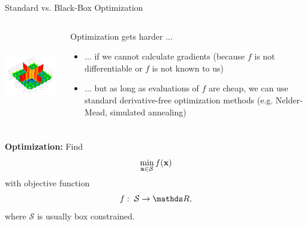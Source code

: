 \documentclass[11pt,compress,t,notes=noshow, xcolor=table]{beamer}
\begin{document}
\begin{vbframe}{Standard vs. Black-Box Optimization}
\begin{columns}
\begin{column}{0.4\textwidth}
\begin{center}
\includegraphics[height = 4cm]{figure_man/cross-in-tray.jpg}
\end{center}
\end{column}
\begin{column}{0.59\textwidth}
Optimization gets harder ...
\begin{itemize}
\item ... if we cannot calculate gradients (because $f$ is not differentiable or $f$ is not known to us)
\item ... but as long as evaluations of $f$ are cheap, we can use standard derivative-free optimization methods (e.g. Nelder-Mead, simulated annealing)
\end{itemize}
\end{column}
\end{columns}

\framebreak 

\textbf{Optimization: } Find
$$
\min_{\mathbf{x} \in \mathcal{S}} f(\mathbf{x})
$$
with objective function
$$
f: \; \mathcal{S} \to \R,
$$
where $\mathcal{S}$ is usually box constrained.

\lz 

\begin{columns}
\begin{column}{0.4\textwidth}

\vspace*{-0.8cm}




\end{column}
\end{columns}
\end{vbframe}
\end{document}
